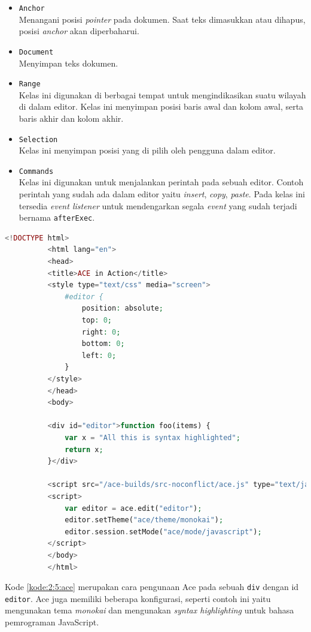 \documentclass[a4paper,twoside]{article}
\begin{document}
\begin{enumerate}
\begin{itemize}
		      \item \verb|Anchor| \\
		            Menangani posisi \textit{pointer} pada dokumen. Saat teks dimasukkan atau dihapus, posisi \textit{anchor} akan diperbaharui.
		      \item \verb|Document| \\
		            Menyimpan teks dokumen.
		      \item \verb|Range| \\
		            Kelas ini digunakan di berbagai tempat untuk mengindikasikan suatu wilayah di dalam editor. Kelas ini menyimpan posisi baris awal dan kolom awal, serta baris akhir dan kolom akhir.
		      \item \verb|Selection| \\
		            Kelas ini menyimpan posisi yang di pilih oleh pengguna dalam editor.
		      \item \verb|Commands| \\
		            Kelas ini digunakan untuk menjalankan perintah pada sebuah editor. Contoh perintah yang sudah ada dalam editor yaitu \textit{insert}, \textit{copy}, \textit{paste}. Pada kelas ini tersedia \textit{event listener} untuk mendengarkan segala \textit{event} yang sudah terjadi bernama \verb|afterExec|.
	      \end{itemize}

	      \begin{lstlisting}[language={php}, caption={Contoh kode pengunaan Ace}, label={kode:2:5:ace}]
		  <!DOCTYPE html>
		  <html lang="en">
		  <head>
		  <title>ACE in Action</title>
		  <style type="text/css" media="screen">
			  #editor { 
				  position: absolute;
				  top: 0;
				  right: 0;
				  bottom: 0;
				  left: 0;
			  }
		  </style>
		  </head>
		  <body>
		  
		  <div id="editor">function foo(items) {
			  var x = "All this is syntax highlighted";
			  return x;
		  }</div>
			  
		  <script src="/ace-builds/src-noconflict/ace.js" type="text/javascript" charset="utf-8"></script>
		  <script>
			  var editor = ace.edit("editor");
			  editor.setTheme("ace/theme/monokai");
			  editor.session.setMode("ace/mode/javascript");
		  </script>
		  </body>
		  </html>
		  \end{lstlisting}

	      Kode \ref{kode:2:5:ace} merupakan cara pengunaan Ace pada sebuah \texttt{div} dengan id \texttt{editor}. Ace juga memiliki beberapa konfigurasi, seperti contoh ini yaitu mengunakan tema \textit{monokai} dan mengunakan \textit{syntax highlighting} untuk bahasa pemrograman JavaScript.


\end{enumerate}
\end{document}
